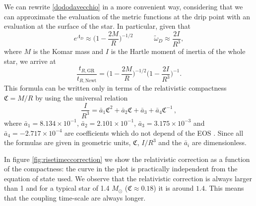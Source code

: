 \documentclass[usenatbib%
]{mnras}
\newcommand{\spc}{\quad \quad \quad}
\begin{document}
We can rewrite \eqref{dododavecchio} in a more convenient way, considering that we can approximate the evaluation of the metric functions at the drip point with an evaluation at the surface of the star. In particular, given that
\begin{equation}
e^{\Lambda_D} \approx \bigg( 1-\dfrac{2M}{R} \bigg)^{-1/2} \spc  \tilde{\omega}_D \approx \dfrac{2I}{R^3},
\end{equation}
where $M$ is the Komar mass and $I$ is the Hartle moment of inertia of the whole star, we arrive at
\begin{equation}\label{IlGranFinale}
\dfrac{t_{R,\textrm{GR}}}{t_{R,\textrm{Newt}}} = \bigg( 1-\dfrac{2M}{R} \bigg)^{-1/2} \bigg( 1 - \dfrac{2I}{R^3} \bigg)^{-1}.
\end{equation}
This formula can be written only in terms of the relativistic compactness $\mathfrak{C}=M/R$ by using the universal relation 
\begin{equation}\label{Universal}
\dfrac{I}{R^3} = \bar{a}_1 \mathfrak{C}^2 + \bar{a}_2 \mathfrak{C} + \bar{a}_3 +\bar{a}_4 \mathfrak{C}^{-1} \, ,
\end{equation}
where  $\bar{a}_1 = 8.134 \times 10^{-1}$, $\bar{a}_2 = 2.101 \times 10^{-1}$, $\bar{a}_3 = 3.175 \times 10^{-3}$ and $\bar{a}_4 =-2.717 \times 10^{-4}$ are coefficients which do not depend of the EOS  \citep{Rezzolla_Universal_2016}.
Since all the formulas are given in geometric units, $\mathfrak{C}$, $I/R^3$ and the $\bar{a}_i$ are dimensionless.

In figure \ref{fig:risetimeccorrection} we show the relativistic correction as a function of the compactness: the curve in the plot is practically independent from the equation of state used. 
We observe that the relativistic correction is always larger than 1 and for a typical star of 1.4 $M_\odot$ ($\mathfrak{C} \approx 0.18$) it is around $1.4$. This means that the coupling time-scale are always longer.
\end{document}
